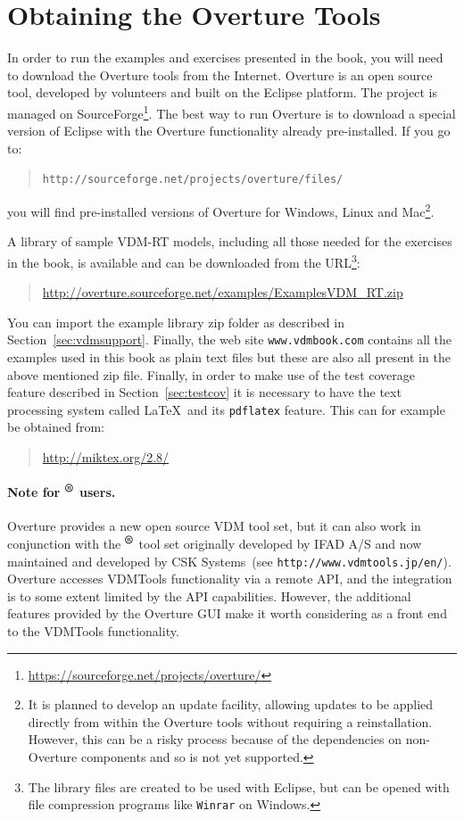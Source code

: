 \section{Obtaining the Overture Tools}\label{sec:install}

In order to run the examples and exercises presented in the book, you
will need to download the Overture tools from the Internet.
Overture is an open source tool, developed by volunteers and built on
the Eclipse platform. The project is managed on
SourceForge\footnote{\url{https://sourceforge.net/projects/overture/}}.
The best way to run Overture is to download a special version of
Eclipse with the Overture functionality already pre-installed. If you
go to:
  \begin{quote}
  \texttt{http://sourceforge.net/projects/overture/files/}
  \end{quote}
  \noindent you will find pre-installed versions of Overture for
  Windows, Linux and Mac\footnote{It is planned to develop an update
    facility, allowing updates to be applied directly from within the
    Overture tools without requiring a reinstallation. However, this
    can be a risky process because of the dependencies on non-Overture
    components and so is not yet supported.}.

A library of sample VDM-RT models, including all those needed
for the exercises in the book, is available and can be downloaded from
the
URL\footnote{The library files are created to be used with Eclipse,
  but can be opened with file compression programs like \texttt{Winrar} on
  Windows.}:
\begin{quote}
\url{http://overture.sourceforge.net/examples/ExamplesVDM_RT.zip}
\end{quote}
You can import the example library zip folder as described in
Section~\ref{sec:vdmsupport}.  Finally, the web site
\texttt{www.vdmbook.com} contains all the examples used in this book
as plain text files but these are also all present in the above
mentioned zip file. Finally, in order to make use of the
test coverage feature described in Section~\ref{sec:testcov} it is
necessary to have the text processing system called \LaTeX\ and its
\texttt{pdflatex} feature. This can for example be obtained from:
\begin{quote}
\url{http://miktex.org/2.8/}
\end{quote}

\paragraph{Note for \vdmtools$^{\mbox{\small\textbf{{\textregistered}}}}$ users.} 
Overture provides a new open source VDM tool set, but it can also work
in conjunction with the
\vdmtools$^{\mbox{\small\textbf{{\textregistered}}}}$
tool set originally developed by IFAD A/S and now maintained and
developed by CSK Systems~(see
\texttt{http://www.vdmtools.jp/en/}). Overture accesses VDMTools
functionality via a remote API, and the integration is to some extent
limited by the API capabilities. However, the additional features
provided by the Overture GUI make it worth considering as a front end
to the VDMTools functionality.
 
